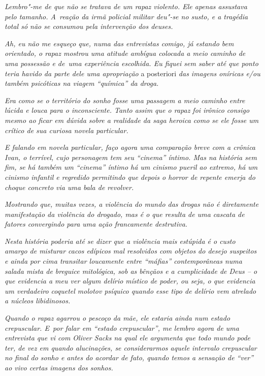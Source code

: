 \emph{Lembro"-me de que não se tratava de um rapaz violento. Ele apenas
assustava pelo tamanho. A~reação da irmã policial militar deu"-se no
susto, e a tragédia total só não se consumou pela intervenção dos
deuses.}

\emph{Ah, eu não me esqueço que, numa das entrevistas comigo, já estando
bem orientado, o rapaz mostrou uma atitude ambígua colocada a meio
caminho de uma possessão e de~uma experiência escolhida. Eu fiquei sem
saber até que ponto teria havido da parte dele uma apropriação} a
posteriori \emph{das imagens oníricas e/ou também psicóticas na viagem
``química'' da droga.}

\emph{Era como se o território do sonho fosse uma passagem a meio
caminho entre lúcida e louca para o inconsciente. Tanto assim que o
rapaz foi irônico consigo mesmo ao ficar em dúvida sobre a realidade da
saga heroica como se ele fosse um crítico de sua curiosa novela
particular.}

\emph{E falando em novela particular, faço agora uma comparação breve
com a crônica Ivan, o terrível, cujo personagem tem seu ``cinema''
íntimo. Mas na história sem fim, se há também um ``cinema'' íntimo há um
cinismo pueril ao extremo, há um cinismo infantil e regredido permitindo
que depois o horror de repente emerja do choque concreto via uma bala de
revolver.}

\emph{Mostrando que, muitas vezes, a violência do mundo das drogas não é
diretamente manifestação da violência do drogado, mas é o que resulta de
uma cascata de fatores convergindo para uma ação francamente
destrutiva.}

\emph{Nesta história poderia até se dizer que a violência mais estúpida é
o custo amargo de misturar cacos edípicos mal resolvidos com objetos do
desejo suspeitos e ainda por cima transitar loucamente entre ``máfias''
contemporâneas numa salada mista de breguice mitológica, sob as bênçãos
e a cumplicidade de Deus -- o que evidencia a meu ver algum delírio
místico de poder, ou seja, o que evidencia um verdadeiro coquetel
molotov psíquico quando esse tipo de delírio vem atrelado a núcleos
libidinosos.}

\emph{Quando o rapaz agarrou o pescoço da mãe, ele estaria ainda num
estado crepuscular. E~por falar em ``estado crepuscular'', me lembro
agora de uma entrevista que vi com Oliver Sacks na qual ele argumenta
que todo mundo pode ter, de vez em quando alucinações, se considerarmos
aquele intervalo crepuscular no final do sonho e antes do acordar de
fato, quando temos a sensação de ``ver'' ao vivo certas imagens dos
sonhos.}

